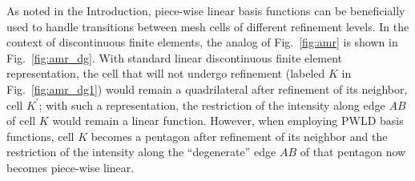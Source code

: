 \documentclass[preprint,10pt]{elsarticle}
\newcommand{\fig}[1]{Fig.~\ref{#1}}                      %
\begin{document}
As noted in the Introduction, piece-wise linear basis functions can be beneficially used to handle transitions
between mesh cells of different refinement levels. In the context of discontinuous finite elements, the
analog of \fig{fig:amr} is shown in \fig{fig:amr_dg}. With standard linear discontinuous finite element representation, 
the cell that will not undergo refinement (labeled $K$ in \fig{fig:amr_dg1}) would remain a quadrilateral 
after refinement of its neighbor, cell $K^\prime$; with such a representation, the restriction of the intensity 
along edge $AB$ of cell $K$ would remain a linear function. However, when employing 
PWLD basis functions, cell $K$ becomes a pentagon after refinement of its neighbor and the 
restriction of the intensity along the ``degenerate'' edge $AB$ of that pentagon now becomes 
piece-wise linear.
\end{document}
